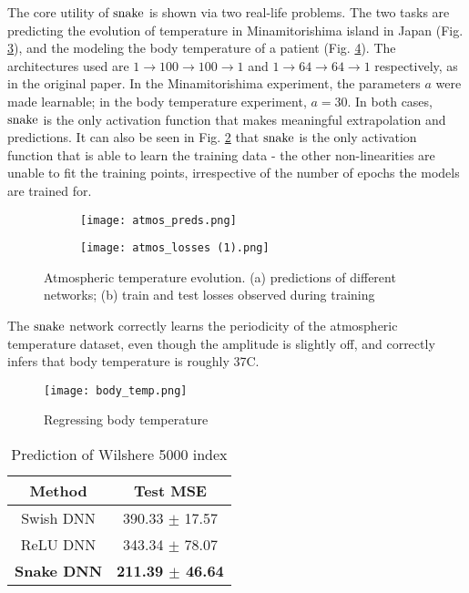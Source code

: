 The core utility of $ \operatorname{snake} $ is shown via two real-life problems. The two tasks are predicting the evolution of temperature in Minamitorishima island in Japan (Fig. \ref{fig:atm}), and the modeling the body temperature of a patient (Fig. \ref{fig:body_temp}). The architectures used are $1\rightarrow100 \rightarrow 100 \rightarrow 1$ and $1 \rightarrow 64 \rightarrow 64 \rightarrow 1$ respectively, as in the original paper. In the Minamitorishima experiment, the parameters $a$ were made learnable; in the body temperature experiment, $a = 30$. In both cases, $ \operatorname{snake} $ is the only activation function that makes meaningful extrapolation and predictions. It can also be seen in Fig. \ref{fig:subim2} that $ \operatorname{snake} $ is the only activation function that is able to learn the training data - the other non-linearities are unable to fit the training points, irrespective of the number of epochs the models are trained for. \\


\begin{figure}[h]
  \centering
  \begin{subfigure}{0.45\textwidth}
    \texttt{[image: atmos\_preds.png]} 
  \caption{}
  \label{fig:subim1}
  \end{subfigure}
  \begin{subfigure}{0.45\textwidth}
    \texttt{[image: atmos\_losses (1).png]}
  \caption{}
  \label{fig:subim2}
  \end{subfigure}

  \caption{Atmospheric temperature evolution. (a) predictions of different networks; (b) train and test losses observed during training}
  \label{fig:atm}
\end{figure}

The $ \operatorname{snake} $ network correctly learns the periodicity of the atmospheric temperature dataset, even though the amplitude is slightly off, and correctly infers that body temperature is roughly 37\degree C. \\

\begin{figure}[h]
  \begin{center}
    \texttt{[image: body\_temp.png]}
  \end{center}
  \caption{Regressing body temperature}
  \label{fig:body_temp}
\end{figure}

\newpage

\begin{wraptable}{r}{5.5cm}
  \begin{center}
\begin{tabular}{ |c|c| } 
 \hline
    Method & Test MSE \\
    \hline
    Swish DNN & 390.33 $\pm$ 17.57 \\
	ReLU DNN & 343.34 $\pm$ 78.07 \\
	\textbf{Snake DNN} & \textbf{211.39 $\pm$ 46.64} \\
 \hline
\end{tabular}
\end{center}
  \caption{Prediction of Wilshere 5000 index}
  \label{table:testmse}
\end{wraptable}

